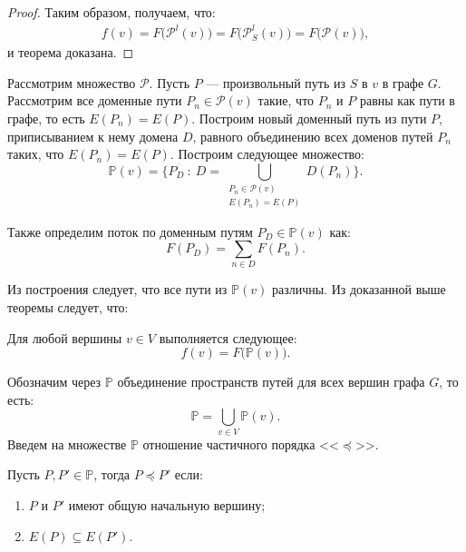 \documentclass[../thesis.tex]{subfiles}
\begin{document}
\begin{proof}
Таким образом, получаем, что:
\begin{eqnarray}
    f(v) = F\big(\mathcal{P}^l(v)\big) = F\big(\mathcal{P}^l_S(v)\big) = F\big(\mathcal{P}(v)\big),
\end{eqnarray}
и теорема доказана.
\end{proof}

Рассмотрим множество $\mathcal{P}$.
Пусть $P$ --- произвольный путь из $S$ в $v$ в графе $G$.
Рассмотрим все доменные пути $P_n\in \mathcal{P}(v)$ такие, что $P_n$ и $P$ равны как пути в графе, то есть $E(P_n)=E(P)$.
Построим новый доменный путь из пути $P$, приписыванием к нему домена $D$, равного объединению всех доменов путей $P_n$ таких, что $E(P_n)=E(P)$.
Построим следующее множество:
\begin{equation}
    \mathbb{P}(v) = \bigg\{ P_D\ :\ D=\bigcup_{\substack{P_n\in \mathcal{P}(v) \\ E(P_n)=E(P)}}{D(P_n)} \bigg\}.
\end{equation}

Также определим поток по доменным путям $P_D\in \mathbb{P}(v)$ как:
\begin{equation}
    F(P_D) = \sum_{n\in D}{F(P_n)}.
\end{equation}

Из построения следует, что все пути из $\mathbb{P}(v)$ различны. Из доказанной выше теоремы следует, что:

\begin{corollary}
Для любой вершины $v \in V$ выполняется следующее:
\begin{equation}
    f(v) = F\big(\mathbb{P}(v)\big).
\end{equation}
\end{corollary}

Обозначим через $\mathbb{P}$ объединение пространств путей для всех вершин графа $G$, то есть:
\begin{equation}
    \mathbb{P} = \bigcup_{v\in V}{\mathbb{P}(v)}.
\end{equation}
Введем на множестве $\mathbb{P}$ отношение частичного порядка <<$\preceq$>>.

\begin{definition}
Пусть $P,P'\in \mathbb{P}$, тогда $P \preceq P'$ если:
\begin{enumerate}
\item $P$ и $P'$ имеют общую начальную вершину;
\item $E(P) \subseteq E(P')$.
\end{enumerate}
\end{definition}
\end{document}
